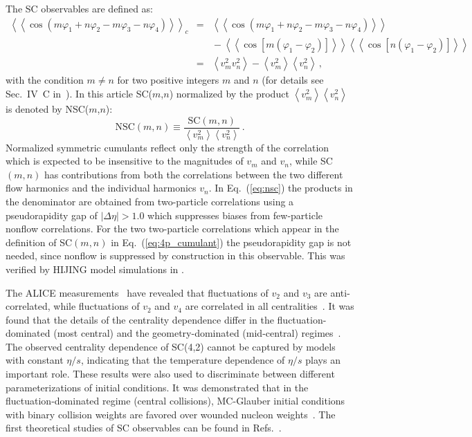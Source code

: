 The SC observables are defined as:
\begin{eqnarray}
\left<\left<\cos(m\varphi_1\!+\!n\varphi_2\!-\!m\varphi_3-\!n\varphi_4)\right>\right>_c &=& \left<\left<\cos(m\varphi_1\!+\!n\varphi_2\!-\!m\varphi_3-\!n\varphi_4)\right>\right>\nonumber\\
&&{}-\left<\left<\cos[m(\varphi_1\!-\!\varphi_2)]\right>\right>\left<\left<\cos[n(\varphi_1\!-\!\varphi_2)]\right>\right>\nonumber\\
&=&\left<v_{m}^2v_{n}^2\right>-\left<v_{m}^2\right>\left<v_{n}^2\right>\,,%
\label{eq:4p_cumulant}
\end{eqnarray}
%
with the condition $m\neq n$ for two positive integers $m$ and $n$ (for details see Sec.~IV~C in~\cite{Bilandzic:2013kga}).
In this article SC($m$,$n$) normalized by the product $\left<v_{m}^2\right>\left<v_{n}^2\right>$~\cite{ALICE:2016kpq,Giacalone:2016afq} is denoted by NSC($m$,$n$):
%
\begin{equation}
\mathrm{NSC}(m,n) \equiv \frac{\mathrm{SC}(m,n)}{\left<v_{m}^2\right>\left<v_{n}^2\right>}\,.
\label{eq:nsc}
\end{equation}
%
Normalized symmetric cumulants reflect only the strength of the correlation which is expected to be insensitive to the magnitudes of $v_{m}$ and $v_{n}$, while SC$(m,n)$ has contributions from both the correlations between the two different flow harmonics and the individual harmonics $v_{n}$. In Eq.~(\ref{eq:nsc}) the products in the denominator are obtained from two-particle correlations using a pseudorapidity gap of $|\Delta\eta| > 1.0$ which suppresses biases from few-particle nonflow correlations. For the two two-particle correlations which appear in the definition of SC$(m,n)$ in Eq.~(\ref{eq:4p_cumulant}) the pseudorapidity gap is not needed, since nonflow is suppressed by construction in this observable. This was verified by HIJING model simulations in \cite{ALICE:2016kpq}.

The ALICE measurements~\cite{ALICE:2016kpq} have revealed that fluctuations of $v_2$ and $v_3$ are anti-correlated, while fluctuations of $v_2$ and $v_4$ are correlated in all centralities~\cite{ALICE:2016kpq}. It was found that the details of the centrality dependence differ in the fluctuation-dominated (most central) and the geometry-dominated (mid-central) regimes~\cite{ALICE:2016kpq}. The observed centrality dependence of SC(4,2) cannot be captured by models with constant $\eta/s$, indicating that the temperature dependence of $\eta/s$ plays an important role. These results were also used to discriminate between different parameterizations of initial conditions. It was demonstrated that in the fluctuation-dominated regime (central collisions), MC-Glauber initial conditions with binary collision weights are favored over wounded nucleon weights~\cite{ALICE:2016kpq}. 
The first theoretical studies of SC observables can be found in Refs.~\cite{Giacalone:2016afq,Qian:2016pau,Gardim:2016nrr,Zhu:2016puf,Ke:2016jrd}.

